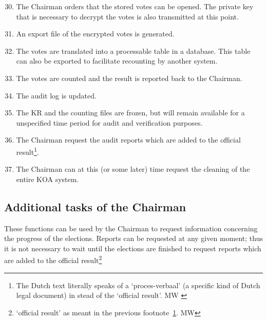 \begin{enumerate}
\setcounter{enumi}{29}
	\item The Chairman orders that the stored votes can be
	opened. The private key that is necessary to decrypt the votes
	is also transmitted at this point.

	\item An export file of the encrypted votes is generated.

	\item The votes are translated into a processable table in a
	database. This table can also be exported to facilitate
	recounting by another system.

	\item The votes are counted and the result is reported back to
	the Chairman.

	\item The audit log is updated.

	\item The KR and the counting files are frozen, but will
	remain available for a unspecified time period for audit and
	verification purposes.

	\item The Chairman request the audit reports which are added
	to the official result\footnote{The Dutch text literally
	speaks of a `proces-verbaal' (a specific kind of Dutch legal
	document) in stead of the `official result'. MW \label{footnote:official_result}}.

	\item The Chairman can at this (or some later) time request
	the cleaning of the entire KOA system.

\end{enumerate}

\subsection{Additional tasks of the Chairman}\label{sec:addit-tasks-chairm}

These functions can be used by the Chairman to request information
concerning the progress of the elections. Reports can be requested at
any given moment; thus it is not necessary to wait until the elections
are finished to request reports which are added to the official
result\footnote{`official result' as meant in the previous
footnote~\ref{footnote:official_result}. MW}

